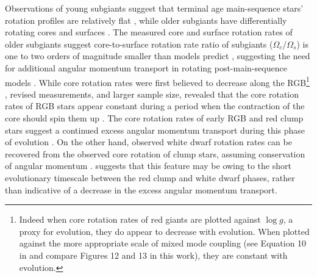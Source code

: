 Observations of young subgiants suggest that terminal age main-sequence stars' rotation profiles are relatively flat \citep{deheuvels_seismic_2020}, while older subgiants have differentially rotating cores and surfaces \citep{deheuvels_seismic_2014}.
The measured core and surface rotation rates of older subgiants suggest core-to-surface rotation rate ratio of subgiants ($\Omega_c / \Omega_s$) is one to two orders of magnitude smaller than models predict \citep{deheuvels_seismic_2014,spada_angular_2016, moyano_asteroseismology_2022}, suggesting the need for additional angular momentum transport in rotating post-main-sequence models \citep{fuller_asteroseismology_2015,spada_angular_2016,ouazzani_gamma_2018, eggenberger_asteroseismology_2019}.
While core rotation rates were first believed to decrease along the RGB\footnote{Indeed when core rotation rates of red giants are plotted against $\log{g}$, a proxy for evolution, they do appear to decrease with evolution. When plotted against the more appropriate scale of mixed mode coupling (see Equation 10 in \citet{gehan_core_2018} and compare Figures 12 and 13 in this work), they are constant with evolution.} \citep{mosser_spin_2012}, revised measurements, and larger sample size, revealed that the core rotation rates of RGB stars appear constant during a period when the contraction of the core should spin them up \citep{mosser_spin_2012,gehan_core_2018,moyano_asteroseismology_2022}.
The core rotation rates of early RGB and red clump stars suggest a continued excess angular momentum transport during this phase of evolution \citep{cantiello_angular_2014,moyano_asteroseismology_2022}.
On the other hand, observed white dwarf rotation rates can be recovered from the observed core rotation of clump stars, assuming conservation of angular momentum \citep{cantiello_angular_2014, den_hartogh_constraining_2019}.
\citet{cantiello_angular_2014} suggests that this feature may be owing to the short evolutionary timescale between the red clump and white dwarf phases, rather than indicative of a decrease in the excess angular momentum transport.

